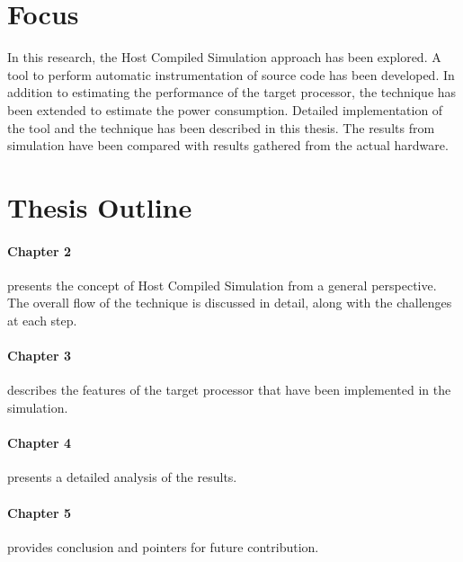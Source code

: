 \section{Focus}
In this research, the Host Compiled Simulation approach has been explored. A tool to perform automatic instrumentation of source code has been developed. In addition to estimating the performance of the target processor, the technique has been extended to estimate the power consumption. Detailed implementation of the tool and the technique has been described in this thesis. The results from simulation have been compared with results gathered from the actual hardware.

\section{Thesis Outline}
\paragraph{Chapter 2} presents the concept of Host Compiled Simulation from a general perspective. The overall flow of the technique is discussed in detail, along with the challenges at each step.

\vspace*{-15pt}
\paragraph{Chapter 3} describes the features of the target processor that have been implemented in the simulation.

\vspace*{-15pt}
\paragraph{Chapter 4} presents a detailed analysis of the results.

\vspace*{-15pt}
\paragraph{Chapter 5} provides conclusion and pointers for future contribution.